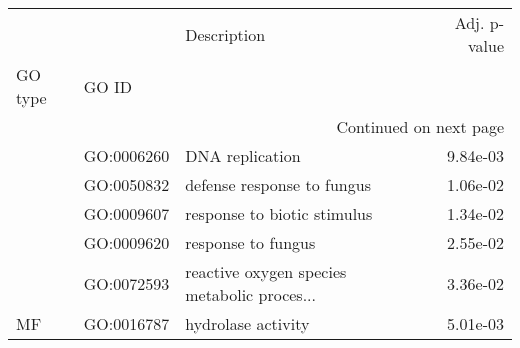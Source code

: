 \begin{longtable}{lllr}
\toprule
   &            &                                  Description &  Adj. p-value \\
GO type & GO ID &                                              &               \\
\midrule
\endhead
\midrule
\multicolumn{4}{r}{{Continued on next page}} \\
\midrule
\endfoot

\bottomrule
\endlastfoot
\multirow{5}{*}{BP} & GO:0006260 &                              DNA replication &      9.84e-03 \\
   & GO:0050832 &                   defense response to fungus &      1.06e-02 \\
   & GO:0009607 &                  response to biotic stimulus &      1.34e-02 \\
   & GO:0009620 &                           response to fungus &      2.55e-02 \\
   & GO:0072593 &  reactive oxygen species metabolic proces... &      3.36e-02 \\
\cline{1-4}
MF & GO:0016787 &                           hydrolase activity &      5.01e-03 \\
\end{longtable}